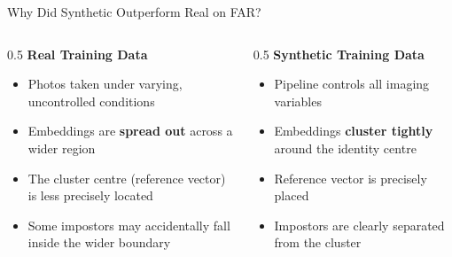 \documentclass[aspectratio=169]{beamer}
\begin{document}
\begin{frame}{Why Did Synthetic Outperform Real on FAR?}

\begin{columns}[T]
\begin{column}{0.5\textwidth}
    \textbf{Real Training Data}
    \begin{itemize}
        \item Photos taken under varying, uncontrolled conditions
        \item Embeddings are \textbf{spread out} across a wider region
        \item The cluster centre (reference vector) is less precisely located
        \item Some impostors may accidentally fall inside the wider boundary
    \end{itemize}
    \vspace{6pt}
    \begin{center}
    \end{center}
\end{column}
\begin{column}{0.5\textwidth}
    \textbf{Synthetic Training Data}
    \begin{itemize}
        \item Pipeline controls all imaging variables
        \item Embeddings \textbf{cluster tightly} around the identity centre
        \item Reference vector is precisely placed
        \item Impostors are clearly separated from the cluster
    \end{itemize}
    \vspace{6pt}
    \begin{center}
    \begin{tikzpicture}[scale=0.75]

\end{tikzpicture}
\end{center}
\end{column}
\end{columns}
\end{frame}
\end{document}
